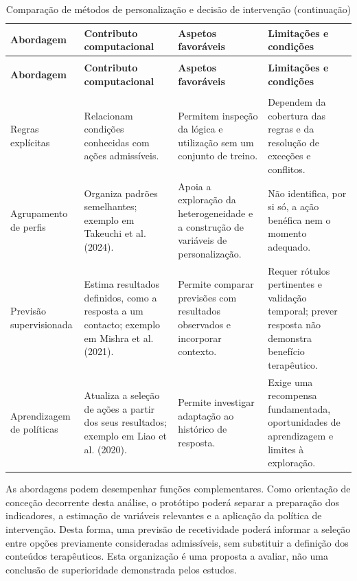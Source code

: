 \begingroup
\small
\renewcommand{\arraystretch}{1.15}
\begin{xltabular}{\textwidth}{@{}>{\raggedright\arraybackslash}p{2.5cm}>{\raggedright\arraybackslash}X>{\raggedright\arraybackslash}X>{\raggedright\arraybackslash}X@{}}
\caption{Comparação de métodos de personalização e decisão de intervenção}\label{tab:personalizationMethods}\\
\toprule
\textbf{Abordagem} & \textbf{Contributo computacional} & \textbf{Aspetos favoráveis} & \textbf{Limitações e condições}\\ \midrule
\endfirsthead
\caption[]{Comparação de métodos de personalização e decisão de intervenção (continuação)}\\
\toprule
\textbf{Abordagem} & \textbf{Contributo computacional} & \textbf{Aspetos favoráveis} & \textbf{Limitações e condições}\\ \midrule
\endhead
\midrule{}\\
\endfoot
\bottomrule
\endlastfoot
Regras explícitas & Relacionam condições conhecidas com ações admissíveis. & Permitem inspeção da lógica e utilização sem um conjunto de treino. & Dependem da cobertura das regras e da resolução de exceções e conflitos.\\ \midrule
Agrupamento de perfis & Organiza padrões semelhantes; exemplo em Takeuchi et al. (2024). & Apoia a exploração da heterogeneidade e a construção de variáveis de personalização. & Não identifica, por si só, a ação benéfica nem o momento adequado.\\ \midrule
Previsão supervisionada & Estima resultados definidos, como a resposta a um contacto; exemplo em Mishra et al. (2021). & Permite comparar previsões com resultados observados e incorporar contexto. & Requer rótulos pertinentes e validação temporal; prever resposta não demonstra benefício terapêutico.\\ \midrule
Aprendizagem de políticas & Atualiza a seleção de ações a partir dos seus resultados; exemplo em Liao et al. (2020). & Permite investigar adaptação ao histórico de resposta. & Exige uma recompensa fundamentada, oportunidades de aprendizagem e limites à exploração.\\
\end{xltabular}
\endgroup

As abordagens podem desempenhar funções complementares. Como orientação de conceção decorrente desta análise, o protótipo poderá separar a preparação dos indicadores, a estimação de variáveis relevantes e a aplicação da política de intervenção. Desta forma, uma previsão de recetividade poderá informar a seleção entre opções previamente consideradas admissíveis, sem substituir a definição dos conteúdos terapêuticos. Esta organização é uma proposta a avaliar, não uma conclusão de superioridade demonstrada pelos estudos.

